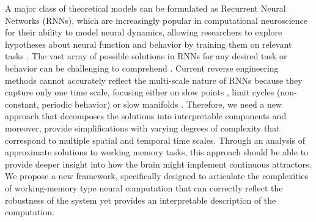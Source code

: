 \documentclass[12pt,letterpaper, onecolumn]{article}
\theoremstyle{definition}
\theoremstyle{remark}
\begin{document}
A major class of theoretical models can be formulated as Recurrent Neural Networks (RNNs), which are increasingly popular in computational neuroscience for their ability to model neural dynamics, allowing researchers to explore hypotheses about neural function and behavior by training them on relevant tasks \citep{barak2017recurrent}. %
%
%
The vast array of possible solutions in RNNs for any desired task or behavior can be challenging to comprehend \citep{lipton2018}.
Current reverse engineering methods cannot accurately reflect the multi-scale nature of RNNs because they capture only one time scale, focusing either on slow points \citep{sussillo2013blackbox}, limit cycles (non-constant, periodic behavior) \citep{pals2024, Zhao2016d} or slow manifolds \citep{ghazizadeh2021slow}.
Therefore, we need a new approach that decomposes the solutions into interpretable components  and moreover, provide simplifications with varying degrees of complexity that correspond to multiple spatial and temporal time scales.
Through an analysis of approximate solutions to working memory tasks, this approach should be able to provide deeper insight into how the brain might implement continuous attractors.
We propose a new framework, specifically designed to articulate the complexities of working-memory type neural computation that can correctly reflect the robustness of the system yet provides an interpretable description of the computation. 


\end{document}

